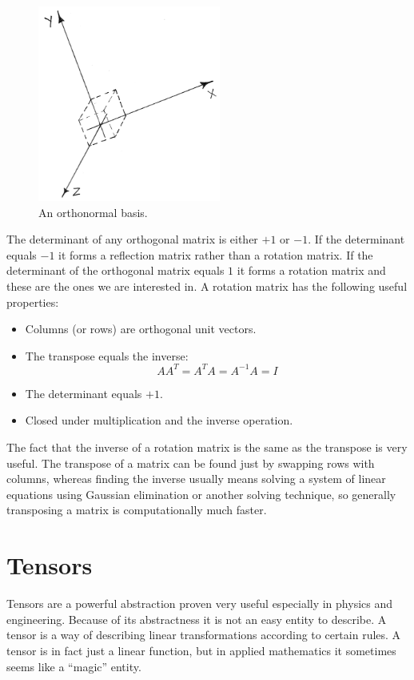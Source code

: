 \begin{figure}
  \centering
  \includegraphics[width=6cm]{./images/mathematics_orthogonal_matrix.png}
\caption{An orthonormal basis.}
\label{fig:orthonormal_basis}
\end{figure}
  
The determinant of any orthogonal matrix is either $+1$ or $-1$. If the
determinant equals $-1$ it forms a reflection matrix rather than a
rotation matrix.
If the determinant of the orthogonal matrix equals $1$ it forms a
rotation matrix and these are the ones we are interested in. 
%
A rotation matrix has the following useful properties:

\begin{itemize}
\item Columns (or rows) are orthogonal unit vectors.
\item The transpose equals the inverse:
\begin{equation}
\label{eq:inverse_equals_transposed}
A A^T = A^T A = A^{-1} A = I
\end{equation}
\item The determinant equals $+1$.
\item Closed under multiplication and the inverse operation. 
\end{itemize}

The fact that the inverse
of a rotation matrix is the same as the transpose is very
useful. The transpose of a matrix can be found just by swapping rows
with columns, whereas finding the inverse usually means solving a system of
linear equations using Gaussian elimination or another solving
technique, so generally transposing a matrix is computationally much
faster. 


\section{Tensors}
\label{sec:tensors}
Tensors are a powerful abstraction proven
very useful especially in physics and engineering. Because of its
abstractness it is not an easy entity to describe. A tensor is a way
of describing linear transformations according to certain rules.
A tensor is in fact just a linear function, but in applied
mathematics it sometimes seems like a ``magic'' entity. \\  



